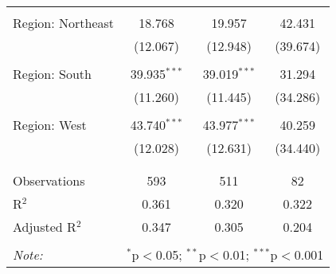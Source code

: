 \begin{tabular}{@{\extracolsep{5pt}}lccc}
  & & & \\ 
 Region: Northeast & 18.768 & 19.957 & 42.431 \\ 
  & (12.067) & (12.948) & (39.674) \\ 
  & & & \\ 
 Region: South & 39.935$^{***}$ & 39.019$^{***}$ & 31.294 \\ 
  & (11.260) & (11.445) & (34.286) \\ 
  & & & \\ 
 Region: West & 43.740$^{***}$ & 43.977$^{***}$ & 40.259 \\ 
  & (12.028) & (12.631) & (34.440) \\ 
  & & & \\ 
\hline \\[-1.8ex] 
Observations & 593 & 511 & 82 \\ 
R$^{2}$ & 0.361 & 0.320 & 0.322 \\ 
Adjusted R$^{2}$ & 0.347 & 0.305 & 0.204 \\ 
\hline 
\hline \\[-1.8ex] 
\textit{Note:}  & \multicolumn{3}{r}{$^{*}$p$<$0.05; $^{**}$p$<$0.01; $^{***}$p$<$0.001} \\ 
\end{tabular} 

